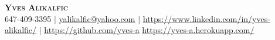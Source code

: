 \begin{center}
	\textbf{\Huge \scshape Yves Alikalfic} \\ \vspace{1pt}
	\small 647-409-3395 $|$
    \href{mailto:yalikalfic@yahoo.com}{\underline{yalikalfic@yahoo.com}} $|$
	\href{https://www.linkedin.com/in/yves-alikalfic/}{\underline{https://www.linkedin.com/in/yves-alikalfic/}} $|$
	\href{https://github.com/yves-a}{\underline{https://github.com/yves-a}}
	\href{https://yves-a.herokuapp.com/}{\underline{https://yves-a.herokuapp.com/}}
\end{center}
